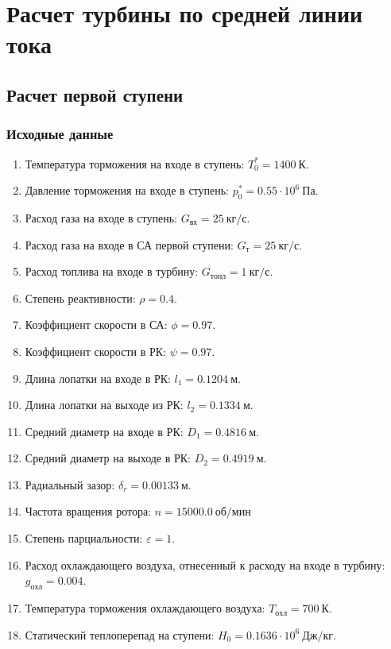 \documentclass[a4paper,10pt]{article}
\begin{document}
    \section{Расчет турбины по средней линии тока}

    
    
    

    \subsection{Расчет первой ступени}

    \subsubsection{Исходные данные}

    
    \begin{enumerate}

        \item Температура торможения на входе в ступень: $T_0^* = 1400\ К $.
        \item Давление торможения на входе в ступень: $p_0^* = 0.55 \cdot 10^6 \ Па$.
        \item Расход газа на входе в ступень: $G_{вх} = 25\ кг/с$.
        \item Расход газа на входе в СА первой ступени: $ G_т = 25\ кг/с $.
        \item Расход топлива на входе в турбину: $ G_{топл} = 1\ кг/с $.
        \item Степень реактивности: $ \rho = 0.4 $.
        \item Коэффициент скорости в СА: $ \phi = 0.97 $.
        \item Коэффициент скорости в РК: $ \psi = 0.97 $.
        \item Длина лопатки на входе в РК: $ l_1 = 0.1204\ м $.
        \item Длина лопатки на выходе из РК: $ l_2 = 0.1334\ м $.
        \item Средний диаметр на входе в РК: $ D_1 = 0.4816\ м $.
        \item Средний диаметр на выходе в РК: $ D_2 = 0.4919\ м $.
        \item Радиальный зазор: $ \delta_r = 0.00133\ м $.
        \item Частота вращения ротора: $ n = 15000.0\ об/мин $
        \item Степень парциальности: $ \varepsilon = 1 $.
        \item Расход охлаждающего воздуха, отнесенный к расходу на входе в турбину: $ g_{охл} = 0.004 $.
        \item Температура торможения охлаждающего воздуха: $ T_{охл} = 700\ К $.

        
        \item Статический теплоперепад на ступени: $ H_0 = 0.1636 \cdot 10^6 \ Дж/кг $.

        

    \end{enumerate}
    
\end{document}
